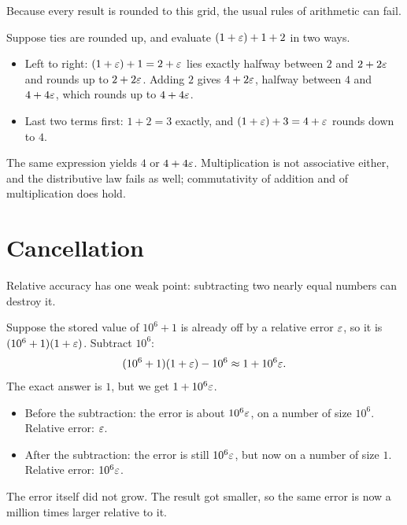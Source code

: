 Because every result is rounded to this grid, the usual rules of arithmetic can fail.

\begin{example}
  \label{ex:nonassoc}
  Suppose ties are rounded up, and evaluate $(1 + \varepsilon) + 1 + 2$ in two ways.
  \begin{itemize}
    \item Left to right: $(1 + \varepsilon) + 1 = 2 + \varepsilon$ lies exactly halfway between $2$ and $2 + 2\varepsilon$ and rounds up to $2 + 2\varepsilon$. Adding $2$ gives $4 + 2\varepsilon$, halfway between $4$ and $4 + 4\varepsilon$, which rounds up to $4 + 4\varepsilon$.
    \item Last two terms first: $1 + 2 = 3$ exactly, and $(1 + \varepsilon) + 3 = 4 + \varepsilon$ rounds down to $4$.
  \end{itemize}
  The same expression yields $4$ or $4 + 4\varepsilon$. Multiplication is not associative either, and the distributive law fails as well; commutativity of addition and of multiplication does hold.
\end{example}

\section{Cancellation}
\label{sec:cancellation}

Relative accuracy has one weak point: subtracting two nearly equal numbers can destroy it.

\begin{example}
  \label{ex:cancel}
  Suppose the stored value of $10^6 + 1$ is already off by a relative error $\varepsilon$, so it is $(10^6 + 1)(1 + \varepsilon)$. Subtract $10^6$:
  \begin{equation}
    (10^6 + 1)(1 + \varepsilon) - 10^6 \approx 1 + 10^6 \varepsilon.
  \end{equation}
  The exact answer is $1$, but we get $1 + 10^6\varepsilon$.
  \begin{itemize}
    \item Before the subtraction: the error is about $10^6\varepsilon$, on a number of size $10^6$. Relative error: $\varepsilon$.
    \item After the subtraction: the error is still $10^6\varepsilon$, but now on a number of size $1$. Relative error: $10^6\varepsilon$.
  \end{itemize}
  The error itself did not grow. The result got smaller, so the same error is now a million times larger relative to it.
\end{example}

